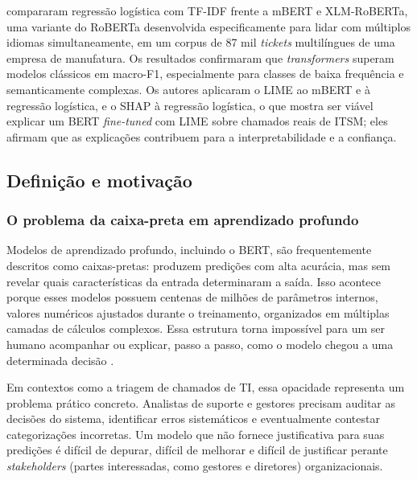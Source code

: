 \documentclass[
    12pt,                %
    openright,           %
    oneside,             %
    a4paper,             %
    english,             %
    brazil               %
]{abntex2}
\begin{document}
 compararam regressão logística com TF-IDF 
frente a mBERT e XLM-RoBERTa, uma variante do RoBERTa desenvolvida 
especificamente para lidar com múltiplos idiomas simultaneamente, 
em um corpus de 87 mil \textit{tickets} multilíngues de uma empresa 
de manufatura. Os resultados confirmaram que \textit{transformers} 
superam modelos clássicos em macro-F1, especialmente para classes 
de baixa frequência e semanticamente complexas. Os autores aplicaram o LIME ao mBERT e à regressão logística, e o SHAP à regressão logística, o que mostra ser viável explicar um BERT \textit{fine-tuned} com LIME sobre chamados reais de ITSM; eles afirmam que as explicações contribuem para a interpretabilidade e a confiança.

\subsection{Definição e motivação}
\label{subsec:xai_definicao}

\subsubsection{O problema da caixa-preta em aprendizado profundo}
\label{subsubsec:xai_caixapreta}

Modelos de aprendizado profundo, incluindo o BERT, são frequentemente descritos como caixas-pretas: produzem predições com alta acurácia, mas sem revelar quais características da entrada determinaram a saída. Isso acontece porque esses modelos possuem centenas de milhões de 
parâmetros internos, valores numéricos ajustados durante o 
treinamento, organizados em múltiplas camadas de cálculos complexos. 
Essa estrutura torna impossível para um ser humano acompanhar ou 
explicar, passo a passo, como o modelo chegou a uma determinada 
decisão \cite{salih2023}.

Em contextos como a triagem de chamados de TI, essa opacidade representa um problema prático concreto. Analistas de suporte e gestores precisam auditar as decisões do sistema, identificar erros sistemáticos e eventualmente contestar categorizações incorretas. Um modelo que não fornece justificativa para suas predições é difícil de depurar, difícil de melhorar e difícil de justificar perante \textit{stakeholders} (partes interessadas, como gestores e diretores) organizacionais.

\end{document}
